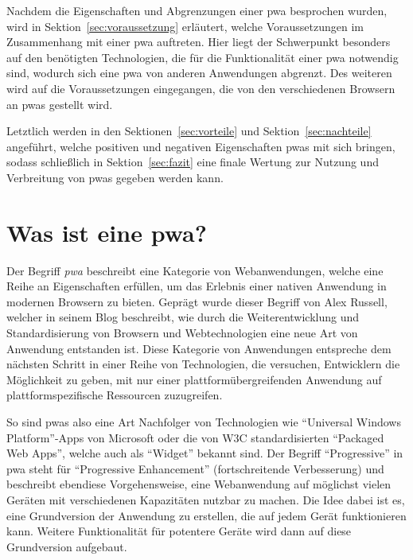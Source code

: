 \documentclass[12pt, parskip=half]{scrartcl}       %
\begin{document}
Nachdem die Eigenschaften und Abgrenzungen einer \ac{pwa} besprochen wurden, wird in Sektion~\ref{sec:voraussetzung} erläutert, welche Voraussetzungen im Zusammenhang mit einer \ac{pwa} auftreten.
Hier liegt der Schwerpunkt besonders auf den benötigten Technologien, die für die Funktionalität einer \ac{pwa} notwendig sind, wodurch sich eine \ac{pwa} von anderen Anwendungen abgrenzt.
Des weiteren wird auf die Voraussetzungen eingegangen, die von den verschiedenen Browsern an \acp{pwa} gestellt wird.

Letztlich werden in den Sektionen~\ref{sec:vorteile} und Sektion~\ref{sec:nachteile} angeführt, welche positiven und negativen Eigenschaften \acp{pwa} mit sich bringen, sodass schließlich in Sektion~\ref{sec:fazit} eine finale Wertung zur Nutzung und Verbreitung von \acp{pwa} gegeben werden kann.


\newpage

\section{Was ist eine \acl{pwa}?}
\label{sec:wasistpwa}



Der Begriff \textit{\acf{pwa}} beschreibt eine Kategorie von Webanwendungen, welche eine Reihe an Eigenschaften erfüllen, um das Erlebnis einer nativen Anwendung in modernen Browsern zu bieten.
Geprägt wurde dieser Begriff von Alex Russell, welcher in seinem Blog\cite{russell_pwaescapingtabs} beschreibt, wie durch die Weiterentwicklung und Standardisierung von Browsern und Webtechnologien eine neue Art von Anwendung entstanden ist.
Diese Kategorie von Anwendungen entspreche dem nächsten Schritt in einer Reihe von Technologien, die versuchen, Entwicklern die Möglichkeit zu geben, mit nur einer plattformübergreifenden Anwendung auf plattformspezifische Ressourcen zuzugreifen.

So sind \acp{pwa} also eine Art Nachfolger von Technologien wie \enquote{Universal Windows Platform}-Apps\cite{msdocs_uwp} von Microsoft oder die von W3C standardisierten \enquote{Packaged Web Apps}\cite{w3c_packagedwebapps}, welche auch als \enquote{Widget} bekannt sind.
Der Begriff \enquote{Progressive} in \acl{pwa} steht für \enquote{Progressive Enhancement} (fortschreitende Verbesserung) und beschreibt ebendiese Vorgehensweise, eine Webanwendung auf möglichst vielen Geräten mit verschiedenen Kapazitäten nutzbar zu machen.
Die Idee dabei ist es, eine Grundversion der Anwendung zu erstellen, die auf jedem Gerät funktionieren kann.
Weitere Funktionalität für potentere Geräte wird dann auf diese Grundversion aufgebaut.
\end{document}
